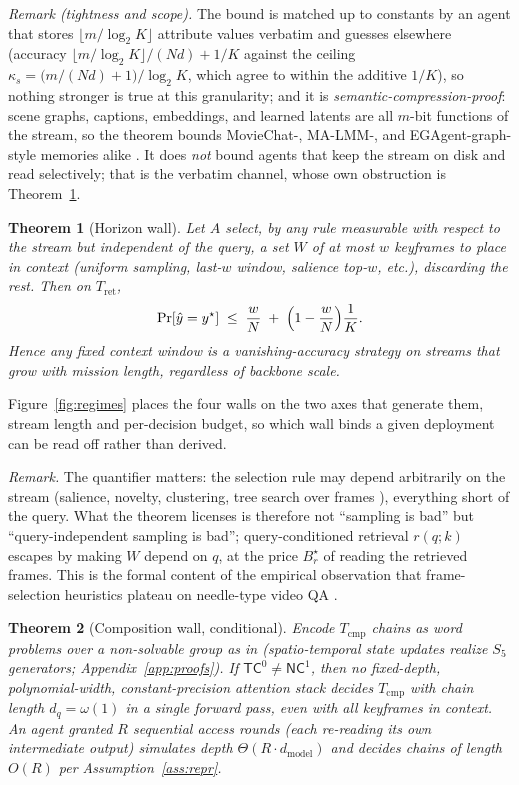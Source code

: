 \documentclass[10pt]{article}
\newtheorem{theorem}{Theorem}
\theoremstyle{definition}
\theoremstyle{plain}
\begin{document}
\emph{Remark (tightness and scope).} The bound is matched up to constants by an agent that stores $\lfloor m/\log_2K\rfloor$ attribute values verbatim and guesses elsewhere (accuracy $\lfloor m/\log_2K\rfloor/(Nd)+1/K$ against the ceiling $\kappa_s=\bigl(m/(Nd)+1\bigr)/\log_2K$, which agree to within the additive $1/K$), so nothing stronger is true at this granularity; and it is \emph{semantic-compression-proof}: scene graphs, captions, embeddings, and learned latents are all $m$-bit functions of the stream, so the theorem bounds MovieChat-, MA-LMM-, and EGAgent-graph-style memories alike \citep{moviechat,malmm,egagent}. It does \emph{not} bound agents that keep the stream on disk and read selectively; that is the verbatim channel, whose own obstruction is Theorem~\ref{thm:horizon}.

\begin{theorem}[Horizon wall]
\label{thm:horizon}
Let $A$ select, by any rule measurable with respect to the stream but \emph{independent of the query}, a set $W$ of at most $w$ keyframes to place in context (uniform sampling, last-$w$ window, salience top-$w$, etc.), discarding the rest. Then on $T_{\mathrm{ret}}$,
\[
\Pr[\hat y=y^{\star}]\;\le\;\frac{w}{N}\;+\;\Bigl(1-\frac{w}{N}\Bigr)\frac{1}{K}.
\]
Hence any fixed context window is a vanishing-accuracy strategy on streams that grow with mission length, regardless of backbone scale.
\end{theorem}

Figure~\ref{fig:regimes} places the four walls on the two axes that generate them, stream length and per-decision budget, so which wall binds a given deployment can be read off rather than derived.

\emph{Remark.} The quantifier matters: the selection rule may depend arbitrarily on the stream (salience, novelty, clustering, tree search over frames \citep{videotree,llovi}), everything short of the query. What the theorem licenses is therefore not ``sampling is bad'' but ``query-independent sampling is bad''; query-conditioned retrieval $r(q;k)$ escapes by making $W$ depend on $q$, at the price $B_r^{\star}$ of reading the retrieved frames. This is the formal content of the empirical observation that frame-selection heuristics plateau on needle-type video QA \citep{videoagent,goldfish}.

\begin{theorem}[Composition wall, conditional]
\label{thm:circuit}
Encode $T_{\mathrm{cmp}}$ chains as word problems over a non-solvable group as in \citep{shortcuts,merrill-cot} (spatio-temporal state updates realize $S_5$ generators; Appendix~\ref{app:proofs}). If $\mathsf{TC}^0\neq\mathsf{NC}^1$, then no fixed-depth, polynomial-width, constant-precision attention stack decides $T_{\mathrm{cmp}}$ with chain length $d_q=\omega(1)$ in a \emph{single} forward pass, even with all keyframes in context. An agent granted $R$ sequential access rounds (each re-reading its own intermediate output) simulates depth $\Theta(R\cdot d_{\mathrm{model}})$ and decides chains of length $O(R)$ per Assumption~\ref{ass:repr}.
\end{theorem}
\end{document}
